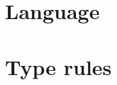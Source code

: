 \documentclass[12pt]{article}
\begin{document}
\maketitle

\begin{abstract}
... \ldots
\end{abstract}

\section{Language}
\section{Type rules}
\end{document}
